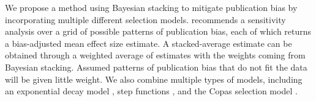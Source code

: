 \documentclass[12pt]{article}   	%
\numberwithin{equation}{section}
\begin{document}
We propose a method using Bayesian stacking to mitigate publication bias by incorporating multiple different selection models. \citet{copas2001sensitivity} recommends a sensitivity analysis over a grid of possible patterns of publication bias, each of which returns a bias-adjusted mean effect size estimate. A stacked-average estimate can be obtained through a weighted average of estimates with the weights coming from Bayesian stacking. Assumed patterns of publication bias that do not fit the data will be given little weight. We also combine multiple types of models, including an exponential decay model \citep{givens1997}, step functions \citep{hedges1992selection, vevea1995pubbias}, and the Copas selection model \citep{copas1997what}. 









\end{document}
